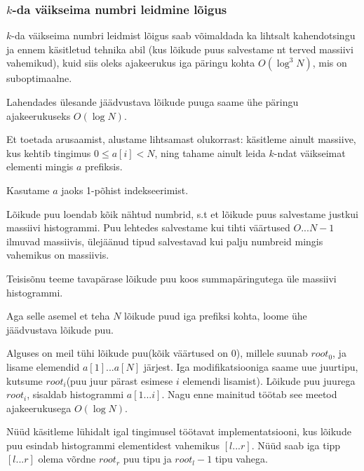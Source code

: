 \documentclass{trkut}
\begin{document}
\subsubsection{$k$-da väikseima numbri leidmine lõigus}

$k$-da väikseima numbri leidmist lõigus saab võimaldada ka lihtsalt kahendotsingu ja ennem käsitletud tehnika abil (kus lõikude puus salvestame nt terved massiivi vahemikud), kuid siis oleks ajakeerukus iga päringu kohta $O(\log^3 N)$, mis on suboptimaalne. \parencite{EMaxx}

Lahendades ülesande jäädvustava lõikude puuga saame ühe päringu ajakeerukuseks $O(\log N)$. \parencite{EMaxx}

Et toetada arusaamist, alustame lihtsamast olukorrast: käsitleme ainult massiive, kus kehtib tingimus $0 \leq a[i] < N$, ning tahame ainult leida $k$-ndat väikseimat elementi mingis $a$ prefiksis. 

Kasutame $a$ jaoks 1-põhist indekseerimist.

Lõikude puu loendab kõik nähtud numbrid, s.t et lõikude puus salvestame justkui massiivi histogrammi. 
Puu lehtedes salvestame kui tihti väärtused $O...N-1$ ilmuvad massiivis, ülejäänud tipud salvestavad kui palju numbreid mingis vahemikus on massiivis.  \parencite{EMaxx}

Teisisõnu teeme tavapärase lõikude puu koos summapäringutega üle massiivi histogrammi.

Aga selle asemel et teha $N$ lõikude puud iga prefiksi kohta, loome ühe jäädvustava lõikude puu.

Alguses on meil tühi lõikude puu(kõik väärtused on $0$), millele suunab $root_0$, ja lisame elemendid $a[1]...a[N]$ järjest. Iga modifikatsiooniga saame uue juurtipu, kutsume $root_i$(puu juur pärast esimese $i$ elemendi lisamist).
Lõikude puu juurega $root_i$, sisaldab histogrammi $a[1...i]$. Nagu enne mainitud töötab see meetod ajakeerukusega $O(\log N)$. \parencite{EMaxx}

Nüüd käsitleme lühidalt igal tingimusel töötavat implementatsiooni, kus lõikude puu esindab histogrammi elementidest vahemikus $[l...r]$.
Nüüd saab iga tipp $[l...r]$ olema võrdne $root_r$ puu tipu ja $root_l-1$ tipu vahega.
\end{document}
